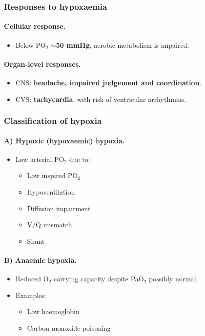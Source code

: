 \documentclass[11pt,a4paper]{article}
\begin{document}
\subsubsection{Responses to hypoxaemia}

\paragraph{Cellular response.}
\begin{itemize}
  \item Below PO$_2$ $\sim$\textbf{50 mmHg}, aerobic metabolism is impaired.
\end{itemize}

\paragraph{Organ-level responses.}
\begin{itemize}
  \item CNS: \textbf{headache, impaired judgement and coordination}.
  \item CVS: \textbf{tachycardia}, with risk of ventricular arrhythmias.
\end{itemize}

\subsubsection{Classification of hypoxia}

\paragraph{A) Hypoxic (hypoxaemic) hypoxia.}
\begin{itemize}
  \item Low arterial PO$_2$ due to:
  \begin{itemize}
    \item Low inspired PO$_2$
    \item Hypoventilation
    \item Diffusion impairment
    \item V/Q mismatch
    \item Shunt
  \end{itemize}
\end{itemize}

\paragraph{B) Anaemic hypoxia.}
\begin{itemize}
  \item Reduced O$_2$ carrying capacity despite PaO$_2$ possibly normal.
  \item Examples:
  \begin{itemize}
    \item Low haemoglobin
    \item Carbon monoxide poisoning
  \end{itemize}
\end{itemize}
\end{document}
